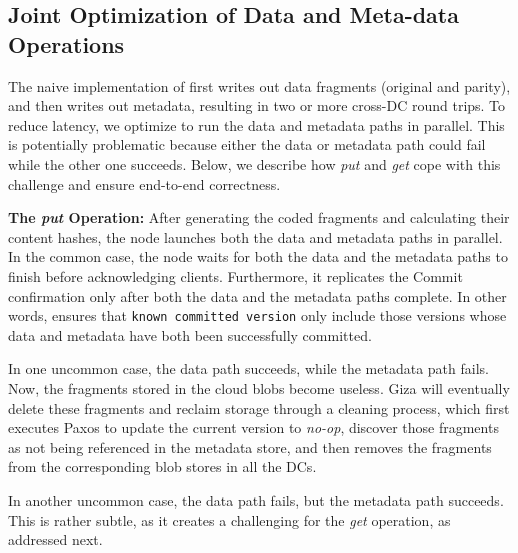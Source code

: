 \subsection{Joint Optimization of Data and Meta-data Operations}

The naive implementation of \name first writes out data fragments (original and parity), 
and then writes out metadata, resulting in two or more cross-DC round trips. To
reduce latency, we optimize \name to run the data and metadata paths in
parallel. This is potentially problematic because either the data or metadata
path could fail while the other one succeeds. Below, we describe how {\em put}
and {\em get} cope with this challenge and ensure end-to-end correctness.


{\bf The \emph{put} Operation:} After generating the coded fragments and calculating
their content hashes, the \name node launches both the data and metadata paths
in parallel. In the common case, the \name node waits for both the data and the
metadata paths to finish before acknowledging clients. Furthermore, it
replicates the Commit confirmation only after both the data and the metadata
paths complete. In other words, \name ensures that {\tt known committed version}
only include those versions whose data and metadata have both been successfully
committed.

In one uncommon case, the data path succeeds, while the metadata path fails.
Now, the fragments stored in the cloud blobs become useless.
Giza will eventually delete these fragments and reclaim storage through a cleaning process,
which first executes Paxos to update the current version to {\em no-op}, discover those fragments 
as not being referenced in the metadata store, 
and then removes the fragments from the corresponding blob stores in all the DCs.

In another uncommon case, the data path fails, but the metadata path succeeds.
This is rather subtle, as it creates a challenging for the {\em get} operation,
as addressed next.

